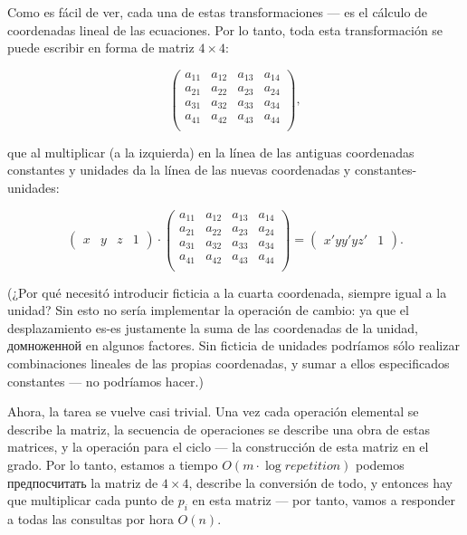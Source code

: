 Como es fácil de ver, cada una de estas transformaciones --- es el cálculo de coordenadas lineal de las ecuaciones. Por lo tanto, toda esta transformación se puede escribir en forma de matriz $4 \times 4$:

$$ \begin{pmatrix}
a_11 & a_{12} & a_{13} & a_{14} \\
a_21 & a_{22} & a_{23} & a_{24} \\
a_31 & a_{32} & a_{33} & a_{34} \\
a_41 & a_{42} & a_{43} & a_{44} \\
\end{pmatrix}, $$

que al multiplicar (a la izquierda) en la línea de las antiguas coordenadas constantes y unidades da la línea de las nuevas coordenadas y constantes-unidades:

$$ \begin{pmatrix} x & y & z & 1 \end{pmatrix} \cdot \begin{pmatrix}
a_{11} & a_{12} & a_{13} & a_{14} \\
a_{21} & a_{22} & a_{23} & a_{24} \\
a_{31} & a_{32} & a_{33} & a_{34} \\
a_{41} & a_{42} & a_{43} & a_{44} \\
\end{pmatrix} = \begin{pmatrix} x' y y' y z' & 1 \end{pmatrix}. $$

(¿Por qué necesitó introducir ficticia a la cuarta coordenada, siempre igual a la unidad? Sin esto no sería implementar la operación de cambio: ya que el desplazamiento es-es justamente la suma de las coordenadas de la unidad, домноженной en algunos factores. Sin ficticia de unidades podríamos sólo realizar combinaciones lineales de las propias coordenadas, y sumar a ellos especificados constantes --- no podríamos hacer.)

Ahora, la tarea se vuelve casi trivial. Una vez cada operación elemental se describe la matriz, la secuencia de operaciones se describe una obra de estas matrices, y la operación para el ciclo --- la construcción de esta matriz en el grado. Por lo tanto, estamos a tiempo $O (m \cdot \log repetition)$ podemos предпосчитать la matriz de $4 \times 4$, describe la conversión de todo, y entonces hay que multiplicar cada punto de $p_i$ en esta matriz --- por tanto, vamos a responder a todas las consultas por hora $O (n)$.



